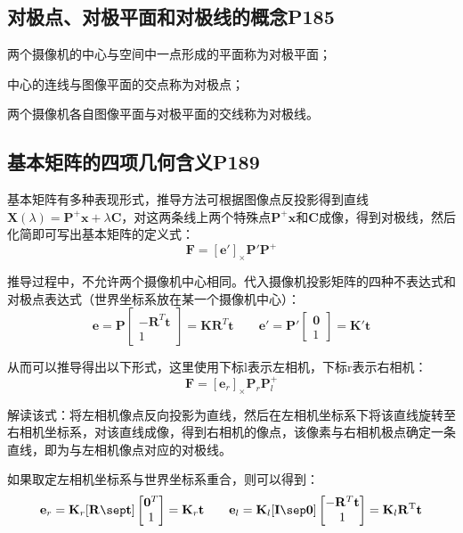 \documentclass[11pt]{article}
\begin{document}
\subsection{对极点、对极平面和对极线的概念P185}
两个摄像机的中心与空间中一点形成的平面称为对极平面；\par
中心的连线与图像平面的交点称为对极点；\par
两个摄像机各自图像平面与对极平面的交线称为对极线。
\subsection{基本矩阵的四项几何含义P189}
基本矩阵有多种表现形式，推导方法可根据图像点反投影得到直线$\mathbf{X}(\lambda)=\mathbf{P^+x}+\lambda\mathbf{C}$，对这两条线上两个特殊点$\mathbf{P^+x}$和$\mathbf{C}$成像，得到对极线，然后化简即可写出基本矩阵的定义式：
\begin{equation*}
  \mathbf{F}=[\mathbf{e}']_\times\mathbf{P}'\mathbf{P}^+
\end{equation*}\par
推导过程中，不允许两个摄像机中心相同。代入摄像机投影矩阵的四种不表达式和对极点表达式（世界坐标系放在某一个摄像机中心）：
\begin{equation*}
  \mathbf{e}=\mathbf{P}\begin{bmatrix}
    -\mathbf{R}^T\mathbf{t} \\
    1
  \end{bmatrix}=\mathbf{KR}^T\mathbf{t}\qquad\mathbf{e}'=\mathbf{P}'\begin{bmatrix}
    \mathbf{0} \\
    1
  \end{bmatrix}=\mathbf{K}'\mathbf{t}
\end{equation*}\par
从而可以推导得出以下形式，这里使用下标l表示左相机，下标r表示右相机：
\begin{equation*}
  \mathbold{F}=[\mathbf{e}_r]_\times\mathbf{P}_r\mathbf{P}^+_l
\end{equation*}\par
解读该式：将左相机像点反向投影为直线，然后在左相机坐标系下将该直线旋转至右相机坐标系，对该直线成像，得到右相机的像点，该像素与右相机极点确定一条直线，即为与左相机像点对应的对极线。\par
如果取定左相机坐标系与世界坐标系重合，则可以得到：
\begin{equation*}
  \mathbf{e}_r=\mathbf{K}_r\mathbf{[R\sep t]}\begin{bmatrix}
    \mathbf{0}^T \\
    1
  \end{bmatrix}=\mathbf{K}_r\mathbf{t}\qquad\mathbf{e}_l=\mathbf{K}_l\mathbf{[I\sep 0]}\begin{bmatrix}
    -\mathbf{R}^T\mathbf{t} \\
    1
  \end{bmatrix}=\mathbf{K}_l\mathbf{R^\mathrm{T}t}
\end{equation*}\par
\end{document}
